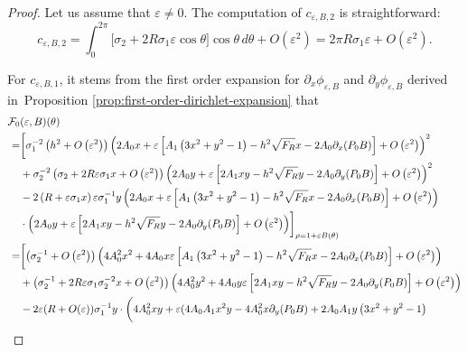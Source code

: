 \documentclass[12pt,reqno]{amsart}
\numberwithin{equation}{section}
\theoremstyle{definition}
\theoremstyle{remark}
\begin{document}
\begin{proof}
	Let us assume that $\varepsilon\neq0$.	The computation of $c_{\varepsilon,B,2}$ is straightforward:
\begin{equation}\label{eq: c_2}
c_{\varepsilon,B,2}= \int_0^{2\pi} \bigl[ \sigma_2 + 2 R\sigma_1\varepsilon\cos\theta \bigr] \cos\theta\,d\theta
+ O(\varepsilon^2)
= 2\pi R\sigma_1\varepsilon  + O(\varepsilon^2) .
\end{equation}
 
For $ c_{\varepsilon,B,1} $, it stems from the first order expansion for $\partial_x\phi_{\varepsilon,B}$ and $\partial_y\phi_{\varepsilon,B}$ derived in~Proposition \ref{prop:first-order-dirichlet-expansion} that
\begin{align}\label{eq: F_0}
 \mathcal F_0&(\varepsilon,B)(\theta)\notag\\
 =& \biggl[\sigma_1^{-2}\left(h^2+O\left(\varepsilon^2\right)\right)\left(2 A_0 x+\varepsilon\left[A_1\left(3 x^2+y^2-1\right) -h^2\sqrt{F_R}x -2 A_0 \partial_x  (P_0B)\right]+O\left(\varepsilon^2\right)\right)^2  \notag\\
& +\sigma_2^{-2}\left(\sigma_2+2 R \varepsilon \sigma_1 x+O\left(\varepsilon^2\right)\right)\left(2 A_0 y+\varepsilon\left[2 A_1 x y -h^2\sqrt{F_R}y-2 A_0 \partial_y (P_0B)\right]+O\left(\varepsilon^2\right)\right)^2  \notag\\
& -2\left(R+\varepsilon \sigma_1 x\right) \varepsilon \sigma_1^{-1} y\left(2 A_0 x+\varepsilon\left[A_1\left(3 x^2+y^2-1\right) -h^2\sqrt{F_R}x -2 A_0 \partial_x  (P_0B)\right]+O\left(\varepsilon^2\right)\right) \notag\\
&  \cdot\left(2 A_0 y+\varepsilon\left[2 A_1 x y -h^2\sqrt{F_R}y-2 A_0 \partial_y (P_0B)\right]+O\left(\varepsilon^2\right)\right)\biggr]_{\rho=1+\varepsilon B(\theta)}  \notag \\
 =& \biggl[\left(\sigma_2^{-1}+O\left(\varepsilon^2\right)\right)\left(4 A_0^2 x^2+4 A_0 x \varepsilon\left[A_1\left(3 x^2+y^2-1\right)-h^2\sqrt{F_R}x - 2A_0 \partial_x (P_0B)\right]+O\left(\varepsilon^2\right)\right)  \notag\\
& +\left(\sigma_2^{-1}+2 R \varepsilon \sigma_1 \sigma_2^{-2} x  +O\left(\varepsilon^2\right)\right)\left(4 A_0^2 y^2+4 A_0 y \varepsilon\left[2 A_1 x y-h^2\sqrt{F_R}y-2 A_0 \partial_y (P_0 B)\right]+O\left(\varepsilon^2\right)\right) \notag\\
& -2 \varepsilon(R+O(\varepsilon)) \sigma_1^{-1} y \cdot\biggl(4 A_0^2 x y+\varepsilon (4 A_0 A_1 x^2 y-4 A_0^2 x \partial_y (P_0 B)+2 A_0 A_1 y\left(3 x^2+y^2-1\right)  \notag \\

\end{align}
\end{proof}
\end{document}
